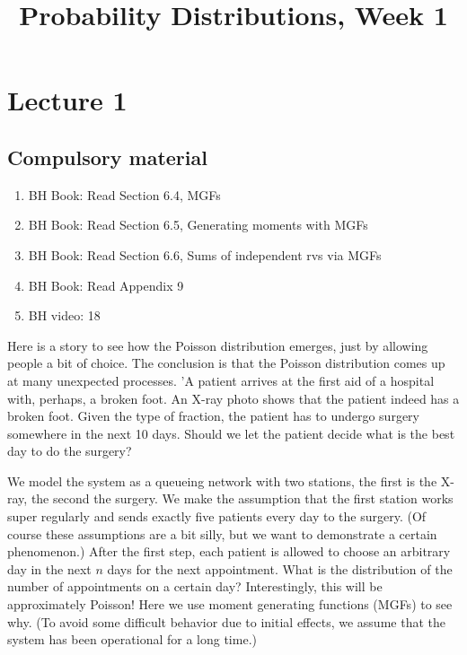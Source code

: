 


\title{Probability Distributions, Week 1}


\maketitle

\toccontents

\section{Lecture 1}


\subsection{Compulsory material}

\begin{enumerate}
\item BH Book: Read Section 6.4, MGFs
\item BH Book: Read Section 6.5, Generating moments with MGFs
\item BH Book: Read Section 6.6, Sums of independent rvs via MGFs
\item BH Book: Read Appendix 9
\item BH video: 18
\end{enumerate}


Here is a story to see how the Poisson distribution emerges, just by allowing people a bit of choice.
The conclusion is that the Poisson distribution comes up at many unexpected processes. 'A patient arrives at the first aid of a hospital with, perhaps, a broken foot.
An X-ray photo shows that the patient indeed has a broken foot.
Given the type of fraction, the patient has to undergo surgery somewhere in the next 10 days.
Should we let the patient decide what is the best day to do the surgery?

We model the system as a queueing network with two stations, the first is the X-ray, the second the surgery.
We make the assumption that the first station works super regularly and sends exactly five patients every day to the surgery.
(Of course these assumptions are a bit silly, but we want to demonstrate a certain phenomenon.)
After the first step, each patient is allowed to choose an arbitrary day in the next $n$ days for the next appointment.
What is the distribution of the number of appointments on a certain day?
Interestingly, this will be approximately Poisson!
Here we use moment generating functions (MGFs) to see why. (To avoid some difficult behavior due to initial effects, we assume that the system has been operational for a long time.)

